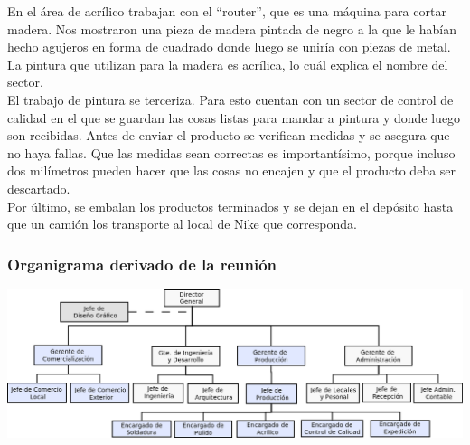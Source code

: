 \documentclass[a4paper,10pt,titlepage]{article}
\begin{document}
En el \'area de acr\'ilico trabajan con el ``router'', que es una m\'aquina para cortar madera. Nos mostraron una pieza de madera pintada de negro a la que le hab\'ian hecho agujeros en forma de cuadrado
donde luego se unir\'ia con piezas de metal. La pintura que utilizan para la madera es acr\'ilica, lo cu\'al explica el nombre del sector.\\ 
El trabajo de pintura se terceriza. Para esto cuentan con un sector de control de calidad en el que se guardan las cosas listas para mandar a pintura y donde luego son recibidas.
Antes de enviar el producto se verifican medidas y se asegura que no haya fallas. Que las medidas sean correctas es important\'isimo, porque incluso 
dos milímetros pueden hacer que las cosas no encajen y que el producto deba ser descartado. \\
Por \'ultimo, se embalan los productos terminados y se dejan en el dep\'osito hasta que un cami\'on los transporte al local de Nike que corresponda.



\subsubsection*{\textbf{Organigrama derivado de la reuni\'on}}
\begin{center}
\includegraphics[angle=90,scale=0.55]{./Organigramas/IcomOrganigramaNuestro4.png}
\end{center}

\newpage
\end{document}

